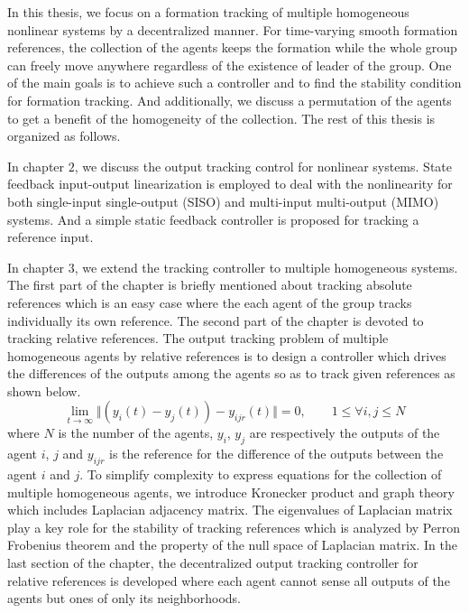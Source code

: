 \documentclass[11pt, a4paper, oneside, openany, reqno]{book}
\theoremstyle{definition}
\theoremstyle{remark}
\numberwithin{equation}{chapter} %
\begin{document}
In this thesis, we focus on a formation tracking of multiple homogeneous nonlinear systems 
by a decentralized manner. For time-varying smooth formation references, 
the collection of the agents keeps the formation while the whole group can freely move anywhere
regardless of the existence of leader of the group.
One of the main goals is to achieve such a controller and to find the stability condition
for formation tracking. And additionally, we discuss a permutation of the agents to get a benefit of
the homogeneity of the collection. The rest of this thesis is organized as follows.

In chapter $ 2 $, we discuss the output tracking control for nonlinear systems.
State feedback input-output linearization is employed to deal with the nonlinearity 
for both single-input single-output (SISO) and multi-input multi-output (MIMO) systems. 
And a simple static feedback controller is proposed for tracking a reference input.

In chapter $ 3 $, we extend the tracking controller to multiple homogeneous systems.
The first part of the chapter is briefly mentioned about tracking absolute references 
which is an easy case where the each agent of the group tracks individually its own reference.
The second part of the chapter is devoted to tracking relative references.
The output tracking problem of multiple homogeneous agents by relative references is
to design a controller which drives the differences of the outputs among the agents 
so as to track given references as shown below.
\begin{equation}
	\lim_{t \to \infty} \Vert \left( y_i(t) - y_j(t) \right) - y_{ijr}(t) \Vert = 0,
	\qquad 1\leq \forall i,j \leq N
\end{equation}
where $ N $ is the number of the agents,
$ y_i $, $ y_j $ are respectively the outputs of the agent $ i $, $ j $ 
and $ y_{ijr} $ is the reference for the difference of the outputs 
between the agent $ i $ and $ j $.
To simplify complexity to express equations for the collection of multiple homogeneous agents, 
we introduce Kronecker product and graph theory which includes Laplacian adjacency matrix.
The eigenvalues of Laplacian matrix play a key role for the stability of tracking references
which is analyzed by Perron Frobenius theorem and the property of the null space of Laplacian matrix.
In the last section of the chapter, 
the decentralized output tracking controller for relative references is developed
where each agent cannot sense all outputs of the agents but ones of only its neighborhoods.
\end{document}
